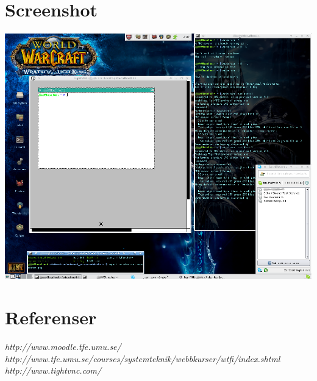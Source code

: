 \documentclass[a4paper,10pt]{article}
\begin{document}
\appendix
\section{Screenshot}
\includegraphics{screenshot.eps}

\section*{Referenser}
\textit{http://www.moodle.tfe.umu.se/} \\
\textit{http://www.tfe.umu.se/courses/systemteknik/webbkurser/wtfi/index.shtml} \\
\textit{http://www.tightvnc.com/} \\
\end{document}
